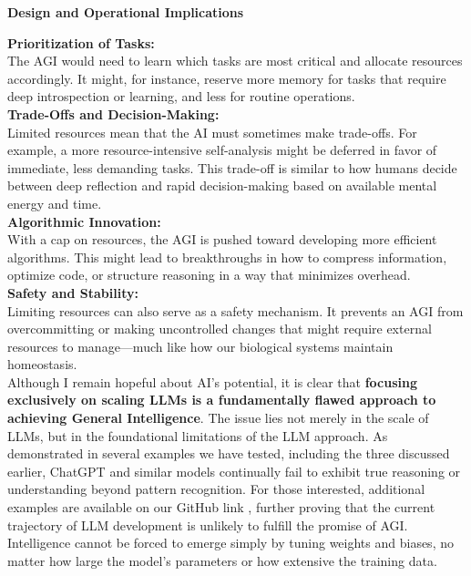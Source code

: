 \documentclass[11pt]{scrartcl}
\begin{document}
\begin{huge}
\textbf{Design and Operational Implications} \\
\end{huge}
\textbf{Prioritization of Tasks:} \\
The AGI would need to learn which tasks are most critical and allocate resources accordingly. It might, for instance, reserve more memory for tasks that require deep introspection or learning, and less for routine operations. \\
\textbf{Trade-Offs and Decision-Making:} \\
Limited resources mean that the AI must sometimes make trade-offs. For example, a more resource-intensive self-analysis might be deferred in favor of immediate, less demanding tasks. This trade-off is similar to how humans decide between deep reflection and rapid decision-making based on available mental energy and time. \\
\textbf{Algorithmic Innovation:} \\
With a cap on resources, the AGI is pushed toward developing more efficient algorithms. This might lead to breakthroughs in how to compress information, optimize code, or structure reasoning in a way that minimizes overhead. \\
\textbf{Safety and Stability:} \\
Limiting resources can also serve as a safety mechanism. It prevents an AGI from overcommitting or making uncontrolled changes that might require external resources to manage—much like how our biological systems maintain homeostasis. \\


Although I remain hopeful about AI's potential, it is clear that \textbf{focusing exclusively on scaling LLMs is a fundamentally flawed approach to achieving General Intelligence}. The issue lies not merely in the scale of LLMs, but in the foundational limitations of the LLM approach. As demonstrated in several examples we have tested, including the three discussed earlier, ChatGPT and similar models continually fail to exhibit true reasoning or understanding beyond pattern recognition. For those interested, additional examples are available on our GitHub link \cite{ref8}, further proving that the current trajectory of LLM development is unlikely to fulfill the promise of AGI. Intelligence cannot be forced to emerge simply by tuning weights and biases, no matter how large the model's parameters or how extensive the training data. \\
\end{document}
